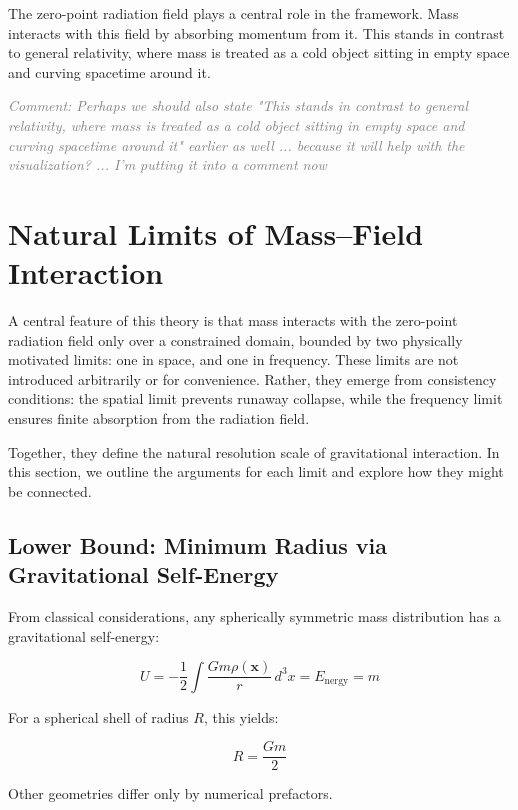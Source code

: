 \documentclass {article}
\renewcommand\vec{\mathbf}
\newcommand{\comment}[1]{\textcolor{gray}{\small\textit{Comment: #1}}}
\begin{document}
The zero-point radiation field plays a central role in the framework. Mass interacts with this field by absorbing momentum from it. This stands in contrast to general relativity, where mass is treated as a cold object sitting in empty space and curving spacetime around it.

\comment{Perhaps we should also state "This stands in contrast to general relativity, where mass is treated as a cold object sitting in empty space and curving spacetime around it" earlier as well ... because it will help with the visualization?  ... I'm putting it into a comment now}




\section{Natural Limits of Mass–Field Interaction}

A central feature of this theory is that mass interacts with the zero-point radiation field only over a constrained domain, bounded by two physically motivated limits: one in space, and one in frequency. These limits are not introduced arbitrarily or for convenience. Rather, they emerge from consistency conditions: the spatial limit prevents runaway collapse, while the frequency limit ensures finite absorption from the radiation field.

Together, they define the natural resolution scale of gravitational interaction. In this section, we outline the arguments for each limit and explore how they might be connected.


\subsection{Lower Bound: Minimum Radius via Gravitational Self-Energy}

From classical considerations, any spherically symmetric mass distribution has a gravitational self-energy:


\begin{equation}
U = -\frac{1}{2} \int \frac{G m \rho(\vec{x})}{r} \, d^3x = E_{\text{nergy}} = m
\end{equation}

For a spherical shell of radius \( R \), this yields:


\begin{equation}
R = \frac{G m}{2}
\end{equation}

Other geometries differ only by numerical prefactors. 
\end{document}
